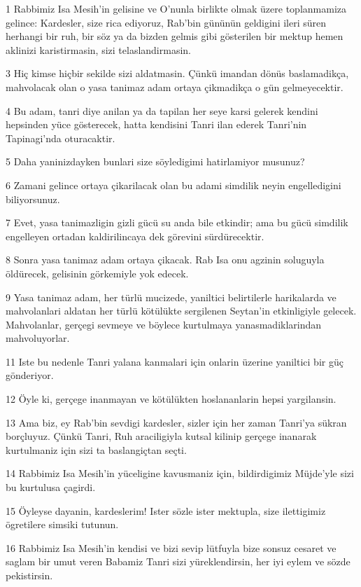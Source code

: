 \par 1 Rabbimiz Isa Mesih'in gelisine ve O'nunla birlikte olmak üzere toplanmamiza gelince: Kardesler, size rica ediyoruz, Rab'bin gününün geldigini ileri süren herhangi bir ruh, bir söz ya da bizden gelmis gibi gösterilen bir mektup hemen aklinizi karistirmasin, sizi telaslandirmasin.
\par 3 Hiç kimse hiçbir sekilde sizi aldatmasin. Çünkü imandan dönüs baslamadikça, mahvolacak olan o yasa tanimaz adam ortaya çikmadikça o gün gelmeyecektir.
\par 4 Bu adam, tanri diye anilan ya da tapilan her seye karsi gelerek kendini hepsinden yüce gösterecek, hatta kendisini Tanri ilan ederek Tanri'nin Tapinagi'nda oturacaktir.
\par 5 Daha yaninizdayken bunlari size söyledigimi hatirlamiyor musunuz?
\par 6 Zamani gelince ortaya çikarilacak olan bu adami simdilik neyin engelledigini biliyorsunuz.
\par 7 Evet, yasa tanimazligin gizli gücü su anda bile etkindir; ama bu gücü simdilik engelleyen ortadan kaldirilincaya dek görevini sürdürecektir.
\par 8 Sonra yasa tanimaz adam ortaya çikacak. Rab Isa onu agzinin soluguyla öldürecek, gelisinin görkemiyle yok edecek.
\par 9 Yasa tanimaz adam, her türlü mucizede, yaniltici belirtilerle harikalarda ve mahvolanlari aldatan her türlü kötülükte sergilenen Seytan'in etkinligiyle gelecek. Mahvolanlar, gerçegi sevmeye ve böylece kurtulmaya yanasmadiklarindan mahvoluyorlar.
\par 11 Iste bu nedenle Tanri yalana kanmalari için onlarin üzerine yaniltici bir güç gönderiyor.
\par 12 Öyle ki, gerçege inanmayan ve kötülükten hoslananlarin hepsi yargilansin.
\par 13 Ama biz, ey Rab'bin sevdigi kardesler, sizler için her zaman Tanri'ya sükran borçluyuz. Çünkü Tanri, Ruh araciligiyla kutsal kilinip gerçege inanarak kurtulmaniz için sizi ta baslangiçtan seçti.
\par 14 Rabbimiz Isa Mesih'in yüceligine kavusmaniz için, bildirdigimiz Müjde'yle sizi bu kurtulusa çagirdi.
\par 15 Öyleyse dayanin, kardeslerim! Ister sözle ister mektupla, size ilettigimiz ögretilere simsiki tutunun.
\par 16 Rabbimiz Isa Mesih'in kendisi ve bizi sevip lütfuyla bize sonsuz cesaret ve saglam bir umut veren Babamiz Tanri sizi yüreklendirsin, her iyi eylem ve sözde pekistirsin.

